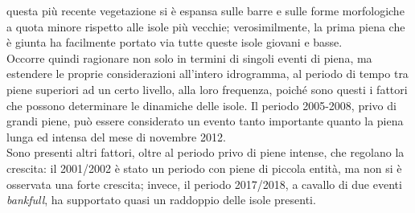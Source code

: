 questa più recente vegetazione si è espansa sulle barre e sulle forme morfologiche a quota minore rispetto alle isole più vecchie;
verosimilmente, la prima piena che è giunta ha facilmente portato via tutte queste isole giovani e basse.
\\
Occorre quindi ragionare non solo in termini di singoli eventi di piena, ma estendere le proprie considerazioni all'intero idrogramma, al periodo di tempo tra piene superiori ad un certo livello, alla loro frequenza, poiché sono questi i fattori che possono determinare le dinamiche delle isole.
Il periodo 2005-2008, privo di grandi piene, può essere considerato un evento tanto importante quanto la piena lunga ed intensa del mese di novembre 2012.
\\
Sono presenti altri fattori, oltre al periodo privo di piene intense, che regolano la crescita: il 2001/2002 è stato un periodo con piene di piccola entità, ma non si è osservata una forte crescita; invece, il periodo 2017/2018, a cavallo di due eventi \emph{bankfull}, ha supportato quasi un raddoppio delle isole presenti.

